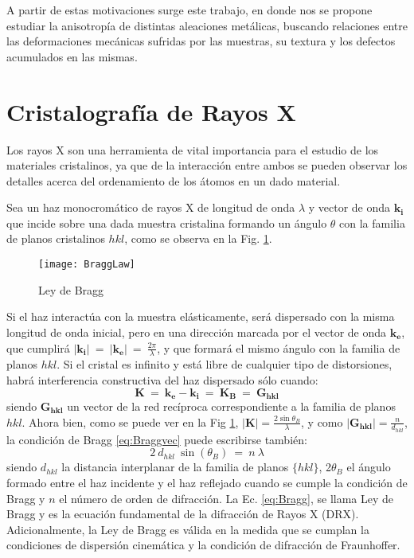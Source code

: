 A partir de estas motivaciones surge este trabajo, en donde nos se propone estudiar la anisotropía de distintas aleaciones metálicas, buscando relaciones entre las deformaciones mecánicas sufridas por las muestras, su textura y los defectos acumulados en las mismas.

\section{Cristalografía de Rayos X}\label{S:DRX}
Los rayos X son una herramienta de vital importancia para el estudio de los materiales cristalinos, ya que de la interacción entre ambos se pueden observar los detalles acerca del ordenamiento de los átomos en un dado material.

Sea un haz monocromático de rayos X de longitud de onda $\lambda$ y vector de onda $\mathbf{k_i}$ que incide sobre una dada muestra cristalina formando un ángulo $\theta$ con la familia de planos cristalinos ${hkl}$, como se observa en la Fig. \ref{fig:Bragg}.

\begin{figure}[htb!]
  \centering
  \texttt{[image: BraggLaw]}
  \caption{Ley de Bragg}
  \label{fig:Bragg}
\end{figure}

Si el haz interactúa con la muestra elásticamente, será dispersado con la misma longitud de onda inicial, pero en una dirección marcada por el vector de onda $\mathbf{k_e}$, que cumplirá $\lvert \mathbf{k_i} \rvert \ = \ \lvert \mathbf{k_e} \rvert \ = \ \frac{2\pi}{\lambda}$, y que formará el mismo ángulo con la familia de planos ${hkl}$.
Si el cristal es infinito y está libre de cualquier tipo de distorsiones, habrá interferencia constructiva del haz dispersado sólo cuando:
\begin{equation}
  \mathbf{K} \ = \ \mathbf{k_e} - \mathbf{k_i} \ = \ \mathbf{K_B} \ = \ \mathbf{G_{hkl}}
  \label{eq:Braggvec}
\end{equation}
\noindent
siendo $\mathbf{G_{hkl}}$ un vector de la red recíproca correspondiente a la familia de planos ${hkl}$.
Ahora bien, como se puede ver en la Fig \ref{fig:Bragg}, $\displaystyle \lvert \mathbf{K} \rvert = \frac{2\sin\theta_B}{\lambda}$, y como $\displaystyle\lvert \mathbf{G_{hkl}} \rvert = \frac{n}{d_{hkl}}$, la condición de Bragg \ref{eq:Braggvec} puede escribirse también:
\begin{equation}
  2 \ d_{hkl} \ \sin(\theta_{B}) \ = \ n \ \lambda
  \label{eq:Bragg}
\end{equation}
\noindent
siendo $d_{hkl}$ la distancia interplanar de la familia de planos $\{hkl\}$, 2$\theta_{B}$ el ángulo formado entre el haz incidente y el haz reflejado cuando se cumple la condición de Bragg y $n$ el número de orden de difracción. La Ec. \ref{eq:Bragg}, se llama Ley de Bragg y es la ecuación fundamental de la difracción de Rayos X (DRX). 
Adicionalmente, la Ley de Bragg es válida en la medida que se cumplan la condiciones de dispersión cinemática y la condición de difracción de Fraunhoffer. 

